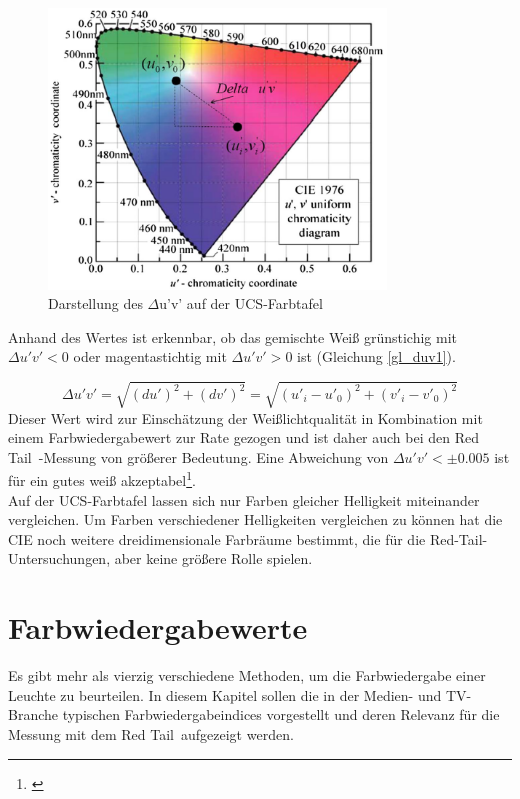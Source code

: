 \begin{figure}[H]     %
\centering
\includegraphics[width=0.8\textwidth]{bilder/duv1} 
\caption {Darstellung des $\Delta$u'v' auf der UCS-Farbtafel}\label{b_duv}
\end{figure}


\noindent Anhand des Wertes ist erkennbar, ob das gemischte Weiß grünstichig mit $\Delta u'v' < 0$ oder magentastichtig mit $\Delta u'v' > 0$ ist (Gleichung \ref{gl_duv1}).

\begin{equation}\label{gl_duv1}
		\Delta u'v'=\sqrt{(du')^{2}+(dv')^{2}}=\sqrt{(u'_{i}-u'_{0})^{2}+(v'_{i}-v'_{0})^{2}}
\end{equation}
Dieser Wert wird zur Einschätzung der Weißlichtqualität in Kombination mit einem Farbwiedergabewert zur Rate gezogen und ist daher auch bei den \glqq Red Tail\grqq\ -Messung von größerer Bedeutung. Eine Abweichung von $\Delta u'v' < \pm 0.005$ ist für ein gutes weiß akzeptabel\footnote{\cite{ohno}}.\\
Auf der UCS-Farbtafel lassen sich nur Farben gleicher Helligkeit miteinander vergleichen. Um Farben verschiedener Helligkeiten vergleichen zu können hat die CIE noch weitere dreidimensionale Farbräume bestimmt, die für die Red-Tail-Untersuchungen, aber keine größere Rolle spielen.\newpage


\chapter{Farbwiedergabewerte}
Es gibt mehr als vierzig verschiedene Methoden, um die Farbwiedergabe einer Leuchte zu beurteilen. In diesem Kapitel sollen die in der Medien- und TV-Branche typischen Farbwiedergabeindices vorgestellt und deren Relevanz für die Messung mit dem \glqq Red Tail\grqq\  aufgezeigt werden.


